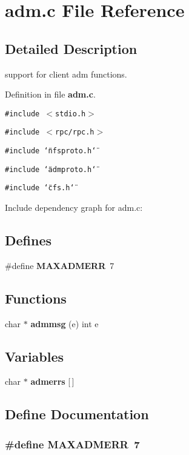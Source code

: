 \section{adm.c File Reference}
\label{adm_8c}


\subsection{Detailed Description}
support for client adm functions.

Definition in file {\bf adm.c}.

{\tt \#include $<$stdio.h$>$}\par
{\tt \#include $<$rpc/rpc.h$>$}\par
{\tt \#include \char`\"{}nfsproto.h\char`\"{}}\par
{\tt \#include \char`\"{}admproto.h\char`\"{}}\par
{\tt \#include \char`\"{}cfs.h\char`\"{}}\par


Include dependency graph for adm.c:\subsection*{Defines}
\begin{CompactItemize}
\item 
\#define {\bf MAXADMERR}\ 7
\end{CompactItemize}
\subsection*{Functions}
\begin{CompactItemize}
\item 
char $\ast$ {\bf admmsg} (e) int e
\end{CompactItemize}
\subsection*{Variables}
\begin{CompactItemize}
\item 
char $\ast$ {\bf admerrs} [$\,$]
\end{CompactItemize}


\subsection{Define Documentation}
\subsubsection{\setlength{\rightskip}{0pt plus 5cm}\#define MAXADMERR\ 7}\label{adm_8c_a0}


